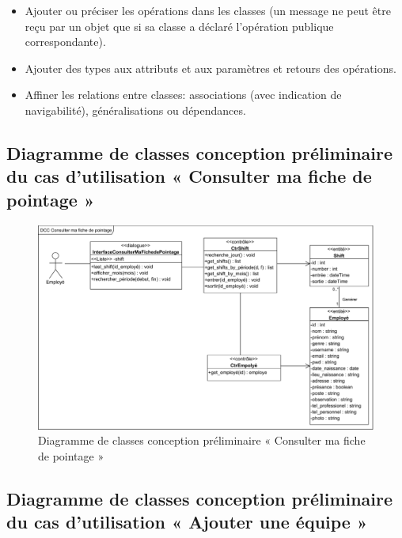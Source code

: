 \begin{itemize}
    \item [\textbullet] Ajouter ou préciser les opérations dans les classes 
        (un message ne peut être reçu par un objet que si sa classe a déclaré 
        l’opération publique correspondante).
    \item [\textbullet] Ajouter des types aux attributs et aux paramètres et 
        retours des opérations. 
    \item [\textbullet] Affiner les relations entre classes: associations 
        (avec indication de navigabilité), généralisations ou dépendances.\cite{5}
\end{itemize}
    
\clearpage

\subsection*{Diagramme de classes conception préliminaire du cas d'utilisation « Consulter ma fiche de pointage »}

\begin{figure}[h!]
    \centering
    \includegraphics[scale=0.74]{images/DCC/DCC Consulter ma fiche de pointage.png}
    \caption{Diagramme de classes conception préliminaire « Consulter ma fiche de pointage »}
    \label{fig42}
\end{figure}
        
\subsection*{Diagramme de classes conception préliminaire du cas d'utilisation « Ajouter une équipe »}

\clearpage

